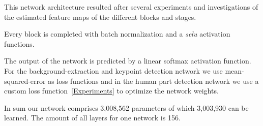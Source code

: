 This network architecture resulted after several experiments and investigations of the estimated feature maps of the
different blocks and stages.

Every block is completed with batch normalization and a \textit{selu} activation functions.

The output of the network is predicted by a linear softmax activation function.
For the background-extraction and keypoint detection network we use mean-squared-error as loss functions and in the
human part detection network we use a custom loss function~\autoref{Experiments} to optimize the network weights.

In sum our network comprises 3,008,562 parameters of which 3,003,930 can be learned.
The amount of all layers for one network is 156.\\







